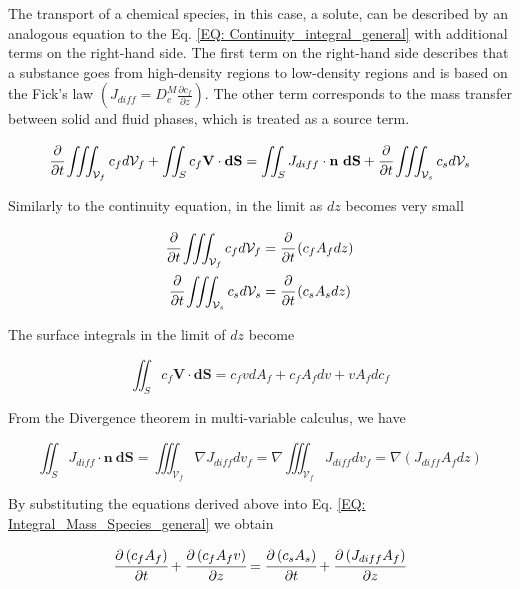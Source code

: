 \documentclass[../Article_Model_Parameters.tex]{subfiles}
\begin{document}
	The transport of a chemical species, in this case, a solute, can be described by an analogous equation to the Eq. \ref{EQ: Continuity_integral_general} with additional terms on the right-hand side. The first term on the right-hand side describes that a substance goes from high-density regions to low-density regions and is based on the Fick's law $\left( J_{diff} = D_e^M\frac{\partial c_f}{\partial z} \right)$. The other term corresponds to the mass transfer between solid and fluid phases, which is treated as a source term.
	
	{\footnotesize
		\begin{equation}
			\cfrac{\partial}{\partial t} \iiint_{\mathcal{V}_f} c_f d\mathcal{V}_f + \iint_S c_f \textbf{V} \cdot \textbf{dS} = \iint_S J_{diff} \cdot \textbf{n}~\textbf{dS} + \cfrac{\partial}{\partial t} \iiint_{\mathcal{V}_s} c_s d\mathcal{V}_s
			\label{EQ: Integral_Mass_Species_general}
		\end{equation}
	}
	
	Similarly to the continuity equation, in the limit as $dz$ becomes very small
	
	{\footnotesize
		\begin{align}
			\cfrac{\partial}{\partial t} \iiint_{\mathcal{V}_f} c_f d\mathcal{V}_f &= \cfrac{\partial}{\partial t}\left( c_f A_f dz \right) \\
			\cfrac{\partial}{\partial t} \iiint_{\mathcal{V}_s} c_s d\mathcal{V}_s &= \cfrac{\partial}{\partial t}\left( c_s A_s dz \right)
		\end{align}
	}

	The surface integrals in the limit of $dz$ become
	
	{\footnotesize
		\begin{equation}
			\iint_S c_f \textbf{V} \cdot \textbf{dS} = c_f v dA_f + c_f A_f dv + v A_f dc_f 
		\end{equation}
	}
	
	From the Divergence theorem in multi-variable calculus, we have
	
	{\footnotesize
		\begin{equation}
			\iint_S J_{diff} \cdot \textbf{n}~\textbf{dS} = \iiint_{\mathcal{V}_f} \nabla J_{diff} dv_f = \nabla \iiint_{\mathcal{V}_f} J_{diff} dv_f = \nabla \left( J_{diff} A_f dz \right)
		\end{equation}
	}
	
	By substituting the equations derived above into Eq. \ref{EQ: Integral_Mass_Species_general} we obtain
	
	{\footnotesize
		\begin{equation}
			\cfrac{\partial \left( c_f A_f \right)}{\partial t} + \cfrac{\partial \left( c_f A_f v \right)}{\partial z} = \cfrac{\partial \left( c_s A_s \right) }{\partial t} + \cfrac{\partial \left( J_{diff} A_f \right) }{\partial z}
		\end{equation}
	}
\end{document}
